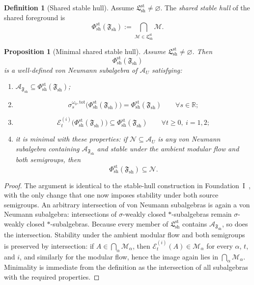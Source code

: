 \documentclass[12pt]{article}
\newtheorem{proposition}[theorem]{Proposition}
\theoremstyle{definition}
\newtheorem{definition}[theorem]{Definition}
\theoremstyle{remark}
\begin{document}
\begin{definition}[Shared stable hull]
\label{def:sharedhull}
Assume \(\mathfrak L_{\mathrm{sh}}^{\mathrm{st}}\neq \varnothing\). The
\emph{shared stable hull} of the shared foreground is
\[
\Phi_{\mathrm{sh}}^{\mathrm{st}}(\mathfrak F_{\mathrm{sh}})
:=
\bigcap_{\mathcal M\in\mathfrak L_{\mathrm{sh}}^{\mathrm{st}}}
\mathcal M.
\]
\end{definition}

\begin{proposition}[Minimal shared stable hull]
\label{prop:sharedhull}
Assume \(\mathfrak L_{\mathrm{sh}}^{\mathrm{st}}\neq\varnothing\). Then
\[
\Phi_{\mathrm{sh}}^{\mathrm{st}}(\mathfrak F_{\mathrm{sh}})
\]
is a well-defined von Neumann subalgebra of \(\mathcal A_U\) satisfying:
\begin{enumerate}
\item
  \(\mathcal A_{\mathfrak F_{\mathrm{sh}}}\subseteq
  \Phi_{\mathrm{sh}}^{\mathrm{st}}(\mathfrak F_{\mathrm{sh}})\);
\item
  \[
  \sigma_s^{\omega_0,\mathrm{tot}}
  \bigl(\Phi_{\mathrm{sh}}^{\mathrm{st}}(\mathfrak F_{\mathrm{sh}})\bigr)
  =
  \Phi_{\mathrm{sh}}^{\mathrm{st}}(\mathfrak F_{\mathrm{sh}})
  \qquad
  \forall s\in\mathbb R;
  \]
\item
  \[
  \mathcal E_t^{(i)}
  \bigl(\Phi_{\mathrm{sh}}^{\mathrm{st}}(\mathfrak F_{\mathrm{sh}})\bigr)
  \subseteq
  \Phi_{\mathrm{sh}}^{\mathrm{st}}(\mathfrak F_{\mathrm{sh}})
  \qquad
  \forall t\ge 0,\ i=1,2;
  \]
\item it is minimal with these properties: if
  \(\mathcal N\subseteq\mathcal A_U\) is any von Neumann subalgebra
  containing \(\mathcal A_{\mathfrak F_{\mathrm{sh}}}\) and stable
  under the ambient modular flow and both semigroups, then
  \[
  \Phi_{\mathrm{sh}}^{\mathrm{st}}(\mathfrak F_{\mathrm{sh}})
  \subseteq
  \mathcal N.
  \]
\end{enumerate}
\end{proposition}

\begin{proof}
The argument is identical to the stable-hull construction in
Foundation~I~\cite{FoundationI}, with the only change that one now
imposes stability under both source semigroups. An arbitrary
intersection of von Neumann subalgebras is again a von Neumann
subalgebra: intersections of \(\sigma\)-weakly closed
\(*\)-subalgebras remain \(\sigma\)-weakly closed \(*\)-subalgebras.
Because every member of
\(\mathfrak L_{\mathrm{sh}}^{\mathrm{st}}\) contains
\(\mathcal A_{\mathfrak F_{\mathrm{sh}}}\), so does the intersection.
Stability under the ambient modular flow and both semigroups is
preserved by intersection: if \(A\in\bigcap_{\alpha}\mathcal M_\alpha\),
then \(\mathcal E_t^{(i)}(A)\in\mathcal M_\alpha\) for every
\(\alpha\), \(t\), and \(i\), and similarly for the modular flow, hence
the image again lies in \(\bigcap_{\alpha}\mathcal M_\alpha\).
Minimality is immediate from the definition as the intersection of all
subalgebras with the required properties.
\end{proof}
\end{document}
